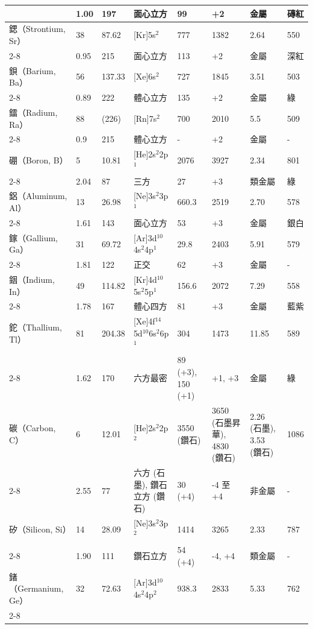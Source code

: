 \documentclass[a4paper,12pt]{report}
\begin{document}
\begin{longtable}[c]{|p{}|p{}|p{}|p{}|p{}|p{}|p{}|p{}|}
& 1.00 & 197 & 面心立方 & 99 & +2 & 金屬 & 磚紅\\\hline
鍶（Strontium, Sr） & 38 & 87.62 & [Kr]5s$^2$ & 777 & 1382 & 2.64 & 550\\\cline{2-8}
& 0.95 & 215 & 面心立方 & 113 & +2 & 金屬 & 深紅\\\hline
鋇（Barium, Ba） & 56 & 137.33 & [Xe]6s$^2$ & 727 & 1845 & 3.51 & 503\\\cline{2-8}
& 0.89 & 222 & 體心立方 & 135 & +2 & 金屬 & 綠\\\hline
鐳（Radium, Ra） & 88 & (226) & [Rn]7s$^2$ & 700 & 2010 & 5.5 & 509\\\cline{2-8}
& 0.9 & 215 & 體心立方 & - & +2 & 金屬 & -\\\hline
硼（Boron, B） & 5 & 10.81 & [He]2s$^2$2p$^1$ & 2076 & 3927 & 2.34 & 801\\\cline{2-8}
& 2.04 & 87 & 三方 & 27 & +3 & 類金屬 & 綠\\\hline
鋁（Aluminum, Al） & 13 & 26.98 & [Ne]3s$^2$3p$^1$ & 660.3 & 2519 & 2.70 & 578\\\cline{2-8}
& 1.61 & 143 & 面心立方 & 53 & +3 & 金屬 & 銀白\\\hline
鎵（Gallium, Ga） & 31 & 69.72 & [Ar]3d$^{10}$4s$^2$4p$^1$ & 29.8 & 2403 & 5.91 & 579\\\cline{2-8}
& 1.81 & 122 & 正交 & 62 & +3 & 金屬 & -\\\hline
銦（Indium, In） & 49 & 114.82 & [Kr]4d$^{10}$5s$^2$5p$^1$ & 156.6 & 2072 & 7.29 & 558\\\cline{2-8}
& 1.78 & 167 & 體心四方 & 81 & +3 & 金屬 & 藍紫\\\hline
鉈（Thallium, Tl） & 81 & 204.38 & [Xe]4f$^{14}$5d$^{10}$6s$^2$6p$^1$ & 304 & 1473 & 11.85 & 589\\\cline{2-8}
& 1.62 & 170 & 六方最密 & 89 (+3), 150 (+1) & +1, +3 & 金屬 & 綠\\\hline
碳（Carbon, C） & 6 & 12.01 & [He]2s$^2$2p$^2$ & 3550 (鑽石) & 3650 (石墨昇華), 4830 (鑽石) & 2.26 (石墨), 3.53 (鑽石) & 1086\\\cline{2-8}
& 2.55 & 77 & 六方 (石墨), 鑽石立方 (鑽石) & 30 (+4) & -4 至 +4 & 非金屬 & -\\\hline
矽（Silicon, Si） & 14 & 28.09 & [Ne]3s$^2$3p$^2$ & 1414 & 3265 & 2.33 & 787\\\cline{2-8}
& 1.90 & 111 & 鑽石立方 & 54 (+4) & -4, +4 & 類金屬 & -\\\hline
鍺（Germanium, Ge） & 32 & 72.63 & [Ar]3d$^{10}$4s$^2$4p$^2$ & 938.3 & 2833 & 5.33 & 762\\\cline{2-8}

\end{longtable}
\end{document}
